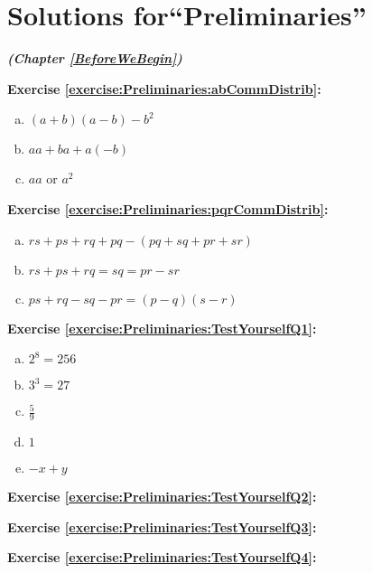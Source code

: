 \section{Solutions for``Preliminaries''}
\noindent\textbf{\textit{ (Chapter \ref{BeforeWeBegin})}}\bigskip


\noindent\textbf{Exercise \ref{exercise:Preliminaries:abCommDistrib}:}
\begin{enumerate}[(a)]
\item  $(a+b)(a-b) - b^2$ 
\item  $aa + ba + a(-b)$
\item  $aa$ or $a^2$
\end{enumerate}

\noindent\textbf{Exercise \ref{exercise:Preliminaries:pqrCommDistrib}:}
\begin{enumerate}[(a)]
\item  $rs + ps + rq + pq - (pq + sq + pr + sr)$ 
\item  $rs + ps + rq = sq = pr - sr$
\item  $ ps + rq - sq - pr = (p-q)(s-r)$
\end{enumerate}


\noindent\textbf{Exercise \ref{exercise:Preliminaries:TestYourselfQ1}:}
\begin{enumerate}[(a)]
\item $2^{8} = 256$
\item $3^3 = 27$
\item $\frac{5}{9}$
\item $1$
\item $-x +y$
\end{enumerate}


\noindent\textbf{Exercise \ref{exercise:Preliminaries:TestYourselfQ2}:}

\noindent\textbf{Exercise \ref{exercise:Preliminaries:TestYourselfQ3}:}

\noindent\textbf{Exercise \ref{exercise:Preliminaries:TestYourselfQ4}:}

